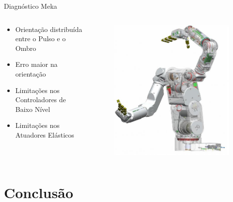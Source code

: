 \documentclass{beamer}
\begin{document}
\begin{frame}{Diagnóstico Meka}
\begin{columns}
\begin{column}{0.5\textwidth}
\begin{itemize}
    \item Orientação distribuída entre o Pulso e o Ombro
    \item Erro maior na orientação
    \item Limitações nos Controladores de Baixo Nível
    \item Limitações nos Atuadores Elásticos
\end{itemize}
\end{column}
\begin{column}{0.5\textwidth}  %
\begin{figure}
    \centering
    \includegraphics[width = \linewidth]{tex/figs/meka-inside.png}
\end{figure}
\end{column}
\end{columns}
\end{frame}

\section{Conclusão}
\end{document}
